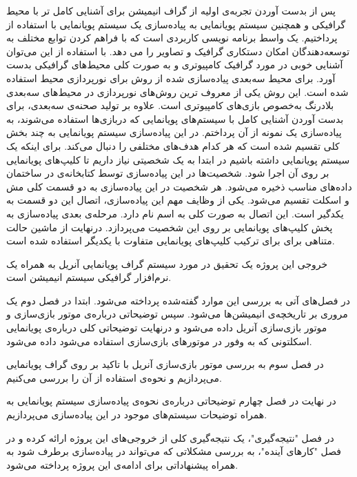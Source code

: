 پس از بدست آوردن تجربه‌ی اولیه از گراف انیمیشن برای آشنایی کامل تر 
با محیط گرافیکی و همچنین سیستم پویانمایی به پیاده‌سازی یک سیستم پویانمایی با استفاده از 
پرداختیم.
یک واسط برنامه نویسی کاربردی
است که با فراهم کردن توابع مختلف به توسعه‌دهندگان امکان دستکاری گرافیک و تصاویر را می ‌دهد.
با استفاده از این 
می‌توان آشنایی خوبی در مورد گرافیک کامپیوتری و به صورت کلی محیط‌های گرافیکی بدست آورد.
برای محیط سه‌بعدی پیاده‌سازی شده از روش 
برای نورپردازی محیط استفاده شده است. این روش یکی از معروف ترین روش‌های نورپردازی در محیط‌های سه‌بعدی بلادرنگ به‌خصوص بازی‌های کامپیوتری است. علاوه بر تولید صحنه‌ی سه‌بعدی،
برای بدست آوردن آشنایی کامل با سیستم‌های پویانمایی که دربازی‌ها استفاده می‌شوند، به پیاده‌سازی یک نمونه از آن پرداختم.
در این پیاده‌سازی سیستم پویانمایی به چند بخش کلی تقسیم شده است که هر کدام هدف‌های مختلفی را دنبال می‌کند.
برای اینکه یک سیستم پویانمایی داشته باشیم در ابتدا به یک شخصیتی نیاز داریم 
تا کلیپ‌های پویانمایی بر روی آن اجرا شود.
شخصیت‌ها در این پیاده‌سازی توسط کتابخانه‌ی 
در ساختمان داده‌های مناسب ذخیره می‌شود.
هر شخصیت در این پیاده‌سازی به دو قسمت کلی مش و اسکلت تقسیم می‌شود.
یکی از وظایف مهم این پیاده‌سازی، اتصال این دو قسمت به یکدگیر 
است.
این اتصال به صورت کلی به اسم 
نام دارد. 
مرحله‌ی بعدی پیاده‌سازی به پخش کلیپ‌های پویانمایی بر روی این شخصیت می‌پردازد.
درنهایت از ماشین حالت متناهی برای برای ترکیب کلیپ‌های پویانمایی متفاوت با یکدیگر استفاده شده است.

خروجی این پروژه یک تحقیق در مورد سیستم گراف پویانمایی آنریل به همراه 
یک نرم‌افزار گرافیکی سیستم انیمیشن است.

در فصل‌های آتی به بررسی این موارد گفته‌شده پرداخته می‌شود.
ابتدا در فصل دوم یک مروری بر تاریخچه‌ی انیمیشن‌ها می‌شود. سپس توضیحاتی درباره‌ی موتور بازی‌سازی و 
موتور بازی‌سازی آنریل داده می‌شود و درنهایت توضیحاتی کلی 
درباره‌ی پویانمایی اسکلتونی که به وفور در موتور‌های بازی‌سازی استفاده می‌شود داده می‌شود.

در فصل سوم به بررسی موتور بازی‌سازی آنریل با تاکید بر روی گراف پویانمایی می‌پردازیم و نحوه‌ی استفاده از آن را بررسی می‌کنیم.

در نهایت در فصل چهارم توضیحاتی درباره‌ی نحوه‌ی پیاده‌سازی سیستم پویانمایی
به همراه توضیحات سیستم‌های موجود در این پیاده‌سازی می‌پردازیم.

در فصل "نتیجه‌گیری"، یک نتیجه‌گیری کلی از خروجی‌های این پروژه ارائه کرده 
و در فصل "کارهای آینده"، به بررسی مشکلاتی که می‌تواند در پیاده‌سازی برطرف شود به همراه 
پیشنهاداتی برای ادامه‌ی این پروژه پرداخته می‌شود.



